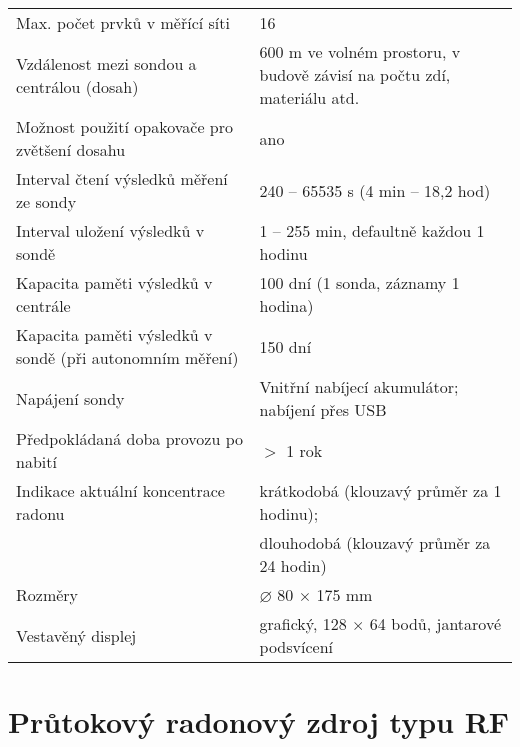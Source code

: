 \begin{table}[H]
\begin{tabular}{p{}p{}}
Max. počet prvků v měřící síti                           & 16                                                                        \\
Vzdálenost mezi sondou a centrálou (dosah)               & 600 m ve volném prostoru, v budově závisí na počtu zdí, materiálu atd.    \\
Možnost použití opakovače pro zvětšení dosahu            & ano                                                                       \\
Interval čtení výsledků měření ze sondy                  & 240 – 65535 s (4 min – 18,2 hod)                                          \\
Interval uložení výsledků v sondě                        & 1 – 255 min, defaultně každou 1 hodinu                                    \\
Kapacita paměti výsledků v centrále                      & 100 dní (1 sonda, záznamy 1 hodina)                                       \\
Kapacita paměti výsledků v sondě (při autonomním měření) & 150 dní                                                                   \\
Napájení sondy                                           & Vnitřní nabíjecí akumulátor; nabíjení přes USB                            \\
Předpokládaná doba provozu po nabití                     & $>$ 1 rok                                                        \\
Indikace aktuální koncentrace radonu                     & krátkodobá (klouzavý průměr za 1 hodinu);                                  \\
                                                         & dlouhodobá (klouzavý průměr za 24 hodin)                                  \\
Rozměry                                                  & $\diameter$ 80 $\times$ 175 mm                                                   \\
Vestavěný displej                                        & grafický, 128 $\times$ 64 bodů, jantarové podsvícení      \\      
\bottomrule
\end{tabular}
\end{table}
\section{Průtokový radonový zdroj typu RF}
